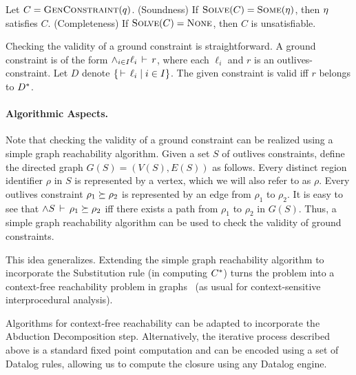 \begin{theorem}
\label{thm:constraint-solver-sc}
Let $C = \textsc{GenConstraint}(q)$.
(Soundness) If $\textsc{Solve}(C) = \textsc{Some}(\eta)$, then $\eta$ satisfies $C$.
(Completeness) If $\textsc{Solve}(C) = \textsc{None}$, then $C$ is unsatisfiable.
\end{theorem}

Checking the validity of a ground constraint is straightforward.
A ground constraint is of the form $\wedge_{i \in I} \ell_i\,\vdash\,r$, where each
$\ell_i$ and $r$ is an outlives-constraint.
Let $D$ denote $\{ \,\vdash\,\ell_i \;|\; i \in I \}$.
The given constraint is valid iff $r$ belongs to ${D}^*$.

\paragraph{Algorithmic Aspects.}
Note that checking the validity of a ground constraint can be realized using
a simple graph reachability algorithm.
%
Given a set $S$ of outlives constraints, define the directed
graph $G(S)=(V(S),E(S))$ as follows.
Every distinct region identifier $\rho$ in $S$ is represented by a vertex,
which we will also refer to as $\rho$.
Every outlives constraint $\rho_1 \succeq \rho_2$ is represented by
an edge from $\rho_1$ to $\rho_2$.
%
%
It is easy to see that $\wedge S\,\vdash\,\rho_1 \succeq \rho_2$ iff
there exists a path from $\rho_1$ to $\rho_2$ in $G(S)$.
%
Thus, a simple graph reachability algorithm can be used to check the validity of
ground constraints.

This idea generalizes.
Extending the simple graph reachability algorithm to incorporate the Substitution rule
(in computing ${C}^*$) turns the problem into a context-free reachability problem in graphs~\cite{Reps:Reachability}
(as usual for context-sensitive interprocedural analysis).

Algorithms for context-free reachability can be adapted to incorporate the Abduction Decomposition step.
Alternatively, the iterative process described above is a standard fixed point computation
and can be encoded using a set of Datalog rules, allowing us to compute the closure
using any Datalog engine.

